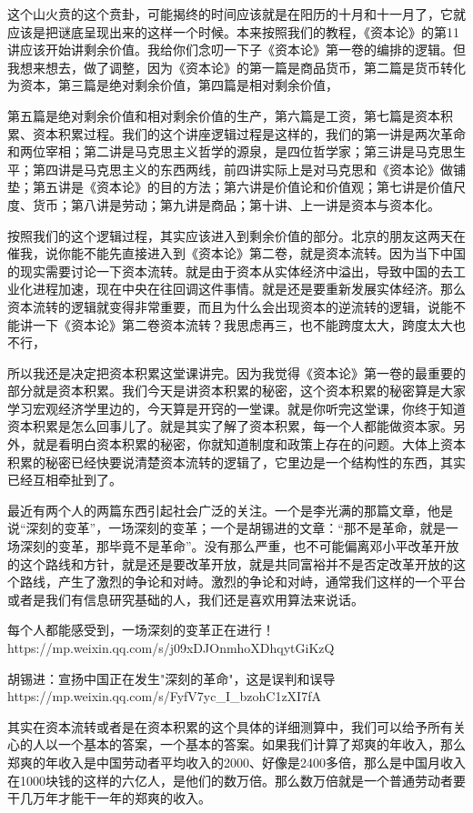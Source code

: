 \documentclass[UTF8, 12pt, a4paper]{ctexrep}
\begin{document}
这个山火贲的这个贲卦，可能揭终的时间应该就是在阳历的十月和十一月了，它就应该是把谜底呈现出来的这样一个时候。本来按照我们的教程，《资本论》的第11讲应该开始讲剩余价值。我给你们念叨一下子《资本论》第一卷的编排的逻辑。但我想来想去，做了调整，因为《资本论》的第一篇是商品货币，第二篇是货币转化为资本，第三篇是绝对剩余价值，第四篇是相对剩余价值，

第五篇是绝对剩余价值和相对剩余价值的生产，第六篇是工资，第七篇是资本积累、资本积累过程。我们的这个讲座逻辑过程是这样的，我们的第一讲是两次革命和两位宰相；第二讲是马克思主义哲学的源泉，是四位哲学家；第三讲是马克思生平；第四讲是马克思主义的东西两线，前四讲实际上是对马克思和《资本论》做铺垫；第五讲是《资本论》的目的方法；第六讲是价值论和价值观；第七讲是价值尺度、货币；第八讲是劳动；第九讲是商品；第十讲、上一讲是资本与资本化。

按照我们的这个逻辑过程，其实应该进入到剩余价值的部分。北京的朋友这两天在催我，说你能不能先直接进入到《资本论》第二卷，就是资本流转。因为当下中国的现实需要讨论一下资本流转。就是由于资本从实体经济中溢出，导致中国的去工业化进程加速，现在中央在往回调这件事情。就是还是要重新发展实体经济。那么资本流转的逻辑就变得非常重要，而且为什么会出现资本的逆流转的逻辑，说能不能讲一下《资本论》第二卷资本流转？我思虑再三，也不能跨度太大，跨度太大也不行，

所以我还是决定把资本积累这堂课讲完。因为我觉得《资本论》第一卷的最重要的部分就是资本积累。我们今天是讲资本积累的秘密，这个资本积累的秘密算是大家学习宏观经济学里边的，今天算是开窍的一堂课。就是你听完这堂课，你终于知道资本积累是怎么回事儿了。就是其实了解了资本积累，每一个人都能做资本家。另外，就是看明白资本积累的秘密，你就知道制度和政策上存在的问题。大体上资本积累的秘密已经快要说清楚资本流转的逻辑了，它里边是一个结构性的东西，其实已经互相牵扯到了。

最近有两个人的两篇东西引起社会广泛的关注。一个是李光满的那篇文章，他是说“深刻的变革”，一场深刻的变革；一个是胡锡进的文章：“那不是革命，就是一场深刻的变革，那毕竟不是革命”。没有那么严重，也不可能偏离邓小平改革开放的这个路线和方针，就是还是要改革开放，就是共同富裕并不是否定改革开放的这个路线，产生了激烈的争论和对峙。激烈的争论和对峙，通常我们这样的一个平台或者是我们有信息研究基础的人，我们还是喜欢用算法来说话。

每个人都能感受到，一场深刻的变革正在进行！ https://mp.weixin.qq.com/s/j09xDJOnmhoXDhqytGiKzQ

胡锡进：宣扬中国正在发生"深刻的革命"，这是误判和误导 https://mp.weixin.qq.com/s/FyfV7yc\_I\_bzohC1zXI7fA

其实在资本流转或者是在资本积累的这个具体的详细测算中，我们可以给予所有关心的人以一个基本的答案，一个基本的答案。如果我们计算了郑爽的年收入，那么郑爽的年收入是中国劳动者平均收入的2000、好像是2400多倍，那么是中国月收入在1000块钱的这样的六亿人，是他们的数万倍。那么数万倍就是一个普通劳动者要干几万年才能干一年的郑爽的收入。
\end{document}
